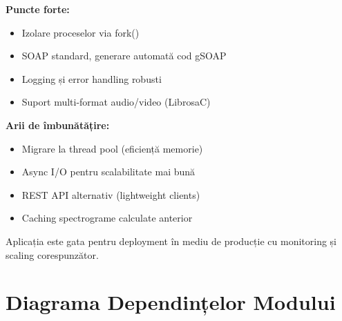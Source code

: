 \documentclass[12pt,a4paper,twoside]{article}
\begin{document}
\begin{itemize}
\textbf{Puncte forte:}
\begin{itemize}
    \item Izolare proceselor via fork()
    \item SOAP standard, generare automată cod gSOAP
    \item Logging și error handling robusti
    \item Suport multi-format audio/video (LibrosaC)
\end{itemize}

\textbf{Arii de îmbunătățire:}
\begin{itemize}
    \item Migrare la thread pool (eficiență memorie)
    \item Async I/O pentru scalabilitate mai bună
    \item REST API alternativ (lightweight clients)
    \item Caching spectrograme calculate anterior
\end{itemize}

Aplicația este gata pentru deployment în mediu de producție cu monitoring și scaling corespunzător.

\appendix

\section{Diagrama Dependințelor Modului}


\end{itemize}
\end{document}
